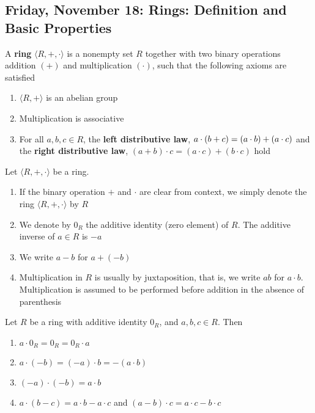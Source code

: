 \subsection{Friday, November 18: Rings: Definition and Basic Properties}

\begin{definition}[Ring]
    A \textbf{ring} $\langle R, +, \cdot \rangle$ is a nonempty set $R$ together with two binary operations addition $(+)$ and multiplication $(\cdot)$, such that the following axioms are satisfied
    
        \begin{enumerate}[label=\textbf{(R\arabic*)}]
           \item $\langle R, + \rangle$ is an abelian group
            \item Multiplication is associative
            \item For all $a, b, c \in R$, the \textbf{left distributive law}, $a \cdot \qty(b + c) = (a \cdot b) + (a \cdot c)$ and the \textbf{right distributive law}, $(a + b) \cdot c = (a \cdot c) + (b \cdot c)$ hold
        \end{enumerate}
\end{definition}

\begin{remark} Let $\langle R, +, \cdot \rangle$ be a ring.
    \begin{enumerate}
        \item If the binary operation $+$ and $\cdot$ are clear from context, we simply denote the ring  $\langle R, +, \cdot \rangle$ by $R$
        \item We denote by $0_R$ the additive identity (zero element) of $R$. The additive inverse of $a \in R$ is $- a$
        \item We write $a - b$ for $a + (-b)$ 
        \item Multiplication in $R$ is usually by juxtaposition, that is, we write $ab$ for $a \cdot b$. Multiplication is assumed to be performed before addition in the absence of parenthesis
    \end{enumerate}
\end{remark}

\begin{theorem} Let $R$ be a ring with additive identity $0_R$, and $a, b, c \in R$. Then

    \begin{enumerate}
        \item $a \cdot 0_R = 0_R = 0_R \cdot a$
        \item $a \cdot (-b) = (-a) \cdot b = - (a \cdot b)$
        \item $(-a) \cdot (-b) = a \cdot b$
        \item $a \cdot (b - c) = a \cdot b - a \cdot c$ and $(a - b) \cdot c = a \cdot c - b \cdot c$
    \end{enumerate}
\end{theorem}

